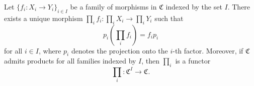 Let $\{f_i: X_i \to Y_i\}_{i \in I}$ be a family of morphisms in $\mathfrak{C}$ indexed by the set $I$. There exists a unique morphism $\prod_i f_i: \prod_i X_i \to \prod_i Y_i$ such that
$$p_i \left( \prod_i f_i \right) = f_i p_i$$
for all $i \in I$, where $p_i$ denotes the projection onto the $i$-th factor. Moreover, if $\mathfrak{C}$ admits products for all families indexed by $I$, then $\prod_i$ is a functor
$$\prod_i : \mathfrak{C}^I \to \mathfrak{C}.$$
